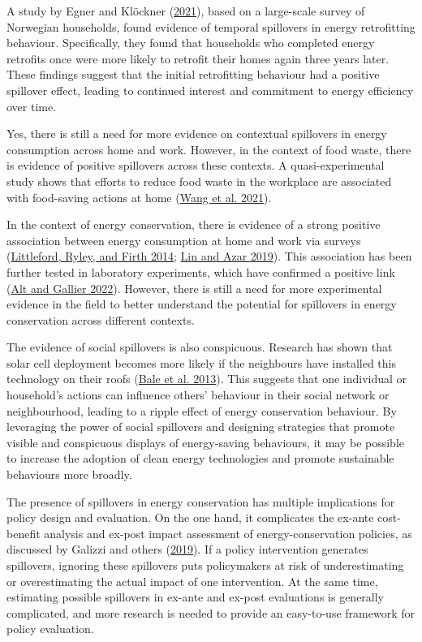 \documentclass[
  11pt,
  captions=heading]{scrreport}
\begin{document}
A study by Egner and Klöckner
(\protect\hyperlink{ref-egner2021temporal}{2021}), based on a
large-scale survey of Norwegian households, found evidence of temporal
spillovers in energy retrofitting behaviour. Specifically, they found
that households who completed energy retrofits once were more likely to
retrofit their homes again three years later. These findings suggest
that the initial retrofitting behaviour had a positive spillover effect,
leading to continued interest and commitment to energy efficiency over
time.

Yes, there is still a need for more evidence on contextual spillovers in
energy consumption across home and work. However, in the context of food
waste, there is evidence of positive spillovers across these contexts. A
quasi-experimental study shows that efforts to reduce food waste in the
workplace are associated with food-saving actions at home
(\protect\hyperlink{ref-wang2021take}{Wang et al. 2021}).

In the context of energy conservation, there is evidence of a strong
positive association between energy consumption at home and work via
surveys (\protect\hyperlink{ref-littleford2014context}{Littleford,
Ryley, and Firth 2014}; \protect\hyperlink{ref-lin2019mixing}{Lin and
Azar 2019}). This association has been further tested in laboratory
experiments, which have confirmed a positive link
(\protect\hyperlink{ref-alt2022incentives}{Alt and Gallier 2022}).
However, there is still a need for more experimental evidence in the
field to better understand the potential for spillovers in energy
conservation across different contexts.

The evidence of social spillovers is also conspicuous. Research has
shown that solar cell deployment becomes more likely if the neighbours
have installed this technology on their roofs
(\protect\hyperlink{ref-bale2013harnessing}{Bale et al. 2013}). This
suggests that one individual or household's actions can influence
others' behaviour in their social network or neighbourhood, leading to a
ripple effect of energy conservation behaviour. By leveraging the power
of social spillovers and designing strategies that promote visible and
conspicuous displays of energy-saving behaviours, it may be possible to
increase the adoption of clean energy technologies and promote
sustainable behaviours more broadly.

The presence of spillovers in energy conservation has multiple
implications for policy design and evaluation. On the one hand, it
complicates the ex-ante cost-benefit analysis and ex-post impact
assessment of energy-conservation policies, as discussed by Galizzi and
others (\protect\hyperlink{ref-galizzi2019measure}{2019}). If a policy
intervention generates spillovers, ignoring these spillovers puts
policymakers at risk of underestimating or overestimating the actual
impact of one intervention. At the same time, estimating possible
spillovers in ex-ante and ex-post evaluations is generally complicated,
and more research is needed to provide an easy-to-use framework for
policy evaluation.
\end{document}
